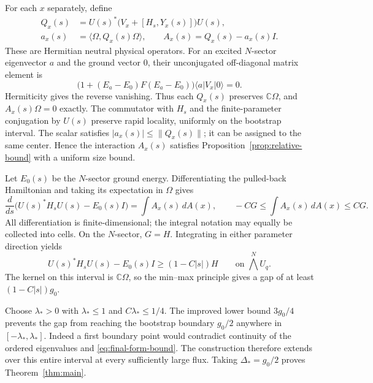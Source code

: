 For each $x$ separately, define
\begin{equation}\label{eq:transport-centered-terms}
 \begin{split}
 Q_x(s)&=U(s)^*\bigl(V_x+[H_s,Y_x(s)]\bigr)U(s),\\
 a_x(s)&=\langle\Omega,Q_x(s)\Omega\rangle,
 \qquad A_x(s)=Q_x(s)-a_x(s)I.
 \end{split}
\end{equation}
These are Hermitian neutral physical operators. For an excited
$N$-sector eigenvector $a$ and the ground vector $0$, their
unconjugated off-diagonal matrix element is
\[
 \bigl(1+(E_a-E_0)F(E_a-E_0)\bigr)
       \langle a|V_x|0\rangle=0.
\]
Hermiticity gives the reverse vanishing. Thus each $Q_x(s)$
preserves $\mathbb C\Omega$, and $A_x(s)\Omega=0$ exactly.
The commutator with $H_s$ and the finite-parameter conjugation by
$U(s)$ preserve rapid locality, uniformly on the bootstrap interval.
The scalar satisfies $|a_x(s)|\le\|Q_x(s)\|$; it can be assigned
to the same center. Hence the interaction $A_x(s)$ satisfies
Proposition~\ref{prop:relative-bound} with a uniform size bound.

Let $E_0(s)$ be the $N$-sector ground energy. Differentiating the
pulled-back Hamiltonian and taking its expectation in $\Omega$
gives
\begin{equation}\label{eq:transport-relative-derivative}
 \frac{d}{ds}\bigl(U(s)^*H_sU(s)-E_0(s)I\bigr)
 =\int A_x(s)\,dA(x),
 \qquad
 -CG\le\int A_x(s)\,dA(x)\le CG.
\end{equation}
All differentiation is finite-dimensional; the integral notation
may equally be collected into cells. On the $N$-sector, $G=H$.
Integrating in either parameter direction yields
\begin{equation}\label{eq:final-form-bound}
 U(s)^*H_sU(s)-E_0(s)I\ge(1-C|s|)H
 \qquad\text{on }\bigwedge^N U_q.
\end{equation}
The kernel on this interval is $\mathbb C\Omega$, so the min--max
principle gives a gap of at least $(1-C|s|)g_0$.

Choose $\lambda_*>0$ with $\lambda_*\le1$ and
$C\lambda_*\le1/4$. The improved lower bound $3g_0/4$ prevents
the gap from reaching the bootstrap boundary $g_0/2$ anywhere in
$[-\lambda_*,\lambda_*]$. Indeed a first boundary point would
contradict continuity of the ordered eigenvalues and
\eqref{eq:final-form-bound}. The construction therefore extends
over this entire interval at every sufficiently large flux. Taking
$\Delta_*=g_0/2$ proves Theorem~\ref{thm:main}.
